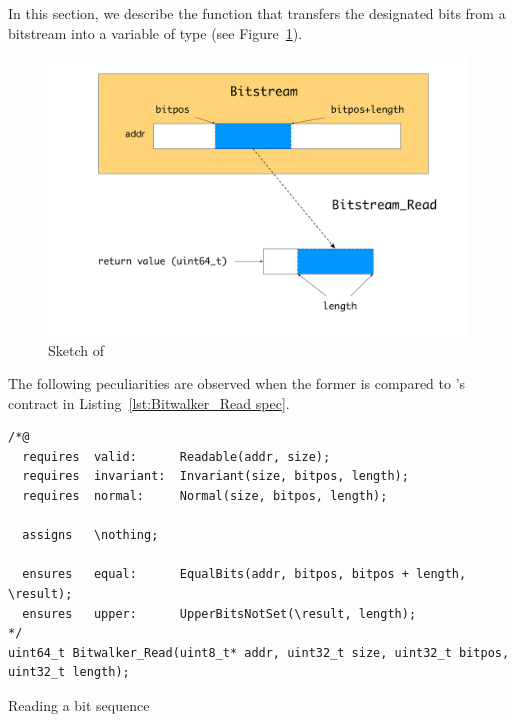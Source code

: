 In this section, we describe the function  that
transfers the designated bits from a bitstream into a variable of type 
(see Figure~\ref{fig:bitstream-read}).


\begin{figure}[hbt]
\begin{center}
\includegraphics[width=0.99\textwidth]{figures/bitstream-read.pdf}
\caption{\label{fig:bitstream-read}
        Sketch of }
\end{center}
\end{figure}



The following peculiarities are observed when the former is
compared to 's contract in Listing~\ref{lst:Bitwalker_Read spec}.

\begin{listing}[hbt]
\begin{minipage}{0.99\textwidth}
\begin{lstlisting}[style=acsl-block]
/*@
  requires  valid:      Readable(addr, size);
  requires  invariant:  Invariant(size, bitpos, length);
  requires  normal:     Normal(size, bitpos, length);

  assigns   \nothing;

  ensures   equal:      EqualBits(addr, bitpos, bitpos + length, \result);
  ensures   upper:      UpperBitsNotSet(\result, length);
*/
uint64_t Bitwalker_Read(uint8_t* addr, uint32_t size, uint32_t bitpos, uint32_t length);
\end{lstlisting}
\end{minipage}
\caption{\label{lst:Bitwalker_Read spec}Reading a bit sequence}
\end{listing}

